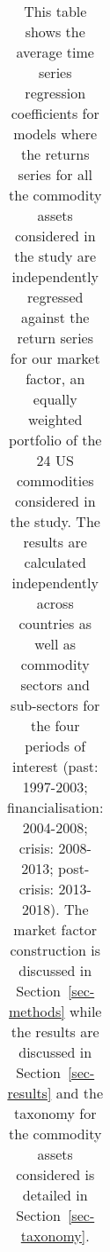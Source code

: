 \documentclass[
  authoryear,
  preprint,
  3p]{elsarticle}
\begin{document}
\begin{longtable}[t]{>{}l>{}l>{}l>{}r>{}r>{}r>{}r}

\caption{\label{tbl-regressions-index}This table shows the average time
series regression coefficients for models where the returns series for
all the commodity assets considered in the study are independently
regressed against the return series for our market factor, an equally
weighted portfolio of the 24 US commodities considered in the study. The
results are calculated independently across countries as well as
commodity sectors and sub-sectors for the four periods of interest
(past: 1997-2003; financialisation: 2004-2008; crisis: 2008-2013;
post-crisis: 2013-2018). The market factor construction is discussed in
Section~\ref{sec-methods} while the results are discussed in
Section~\ref{sec-results} and the taxonomy for the commodity assets
considered is detailed in Section~\ref{sec-taxonomy}.}

\tabularnewline


\end{longtable}
\end{document}
